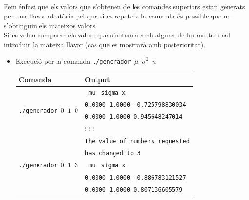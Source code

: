\documentclass[a4paper, 11pt]{article}
\begin{document}
\begin{itemize}
\begin{table}[h]
\begin{center}
\begin{tabular}{ l | l }
            \end{tabular}
            \end{center}
    \end{table}\\
    Fem énfasi que els valors que s'obtenen de les comandes superiors estan generats per una llavor aleatòria pel que si es repeteix la comanda és possible que no s'obtinguin els mateixos valors.\\
    Si es volen comparar els valors que s'obtenen amb alguna de les mostres cal introduir la mateixa llavor (cas que es mostrarà amb posterioritat).
    \end{itemize}
    \newpage
    \begin{itemize}
    \item Execució per la comanda \texttt{./generador $\mu$ $\sigma^2$ $n$}\\
    \begin{table}[h]
            \begin{center}
            \begin{tabular}{ l | l }
            \textbf{Comanda} & \textbf{Output}\\ \hline\hline
            \multirow{4}{*}{\texttt{./generador  $0$  $1$ $0$}} & \hspace{1.5em}\texttt{    mu} \hspace{0.2em}\texttt{  sigma            }\hspace{5.9em}\texttt{x}\\ 
            & \texttt{0.0000 1.0000 -0.725798830034}\\
            & \texttt{0.0000 1.0000 0.945648247014}\\
            & \hspace{2.5em}$\vdots$ \hspace{3em}$\vdots$ \hspace{5.5em}$\vdots$\\\hline
             \multirow{6}{*}{\texttt{./generador  $0$  $1$ $3$}} &\texttt{The value of numbers requested}\\
             & \texttt{has changed to 3} \\
             & \hspace{1.5em}\texttt{    mu} \hspace{0.2em}\texttt{  sigma            }\hspace{5.9em}\texttt{x}\\  
            & \texttt{0.0000 1.0000 -0.886783121527}\\
            & \texttt{0.0000 1.0000 0.807136605579}\\

\end{tabular}
\end{center}
\end{table}
\end{itemize}
\end{document}
